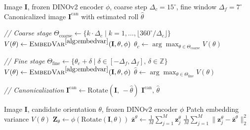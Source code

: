\begin{algorithm}[!htb]
\caption{ROVER: Variance-based Canonical Orientation Estimation}
\label{alg:var_alg}
\begin{algorithmic}[1]
    \REQUIRE Image $\mathbf{I}$, frozen DINOv2 encoder $\phi$, 
             coarse step $\Delta_c = 15^\circ$, fine window 
             $\Delta_f = 7^\circ$
    \ENSURE Canonicalized image $\mathbf{I}^{\mathrm{can}}$ 
            with estimated roll $\hat{\theta}$

    \STATE \textit{// Coarse stage}
    \STATE $\Theta_\text{coarse} \leftarrow 
           \{k \cdot \Delta_c \mid k = 1, \ldots, 
           \lfloor 360^\circ / \Delta_c \rfloor\}$
        \STATE $V(\theta) \leftarrow \textsc{EmbedVar}^{\ref{alg:embedvar}}
               (\mathbf{I}, \theta, \phi)$
    \ENDFOR
    \STATE $\theta_c \leftarrow 
           \arg\max_{\theta \in \Theta_\text{coarse}} V(\theta)$

    \STATE \textit{// Fine stage}
    \STATE $\Theta_\text{fine} \leftarrow 
           \{\theta_c + \delta \mid \delta \in 
           [-\Delta_f, \Delta_f],\, \delta \in \mathbb{Z}\}$
        \STATE $V(\theta) \leftarrow \textsc{EmbedVar}^{\ref{alg:embedvar}}
               (\mathbf{I}, \theta, \phi)$
    \ENDFOR
    \STATE $\hat{\theta} \leftarrow 
           \arg\max_{\theta \in \Theta_\text{fine}} V(\theta)$

    \STATE \textit{// Canonicalization}
    \STATE $\mathbf{I}^{\mathrm{can}} \leftarrow 
           \mathrm{Rotate}(\mathbf{I},\, -\hat{\theta})$
    \RETURN $\mathbf{I}^{\mathrm{can}},\, \hat{\theta}$
\end{algorithmic}
\end{algorithm}

\begin{algorithm}[!htb]
\caption{\textsc{EmbedVar}: Patch Embedding Variance Computation}
\label{alg:embedvar}
\begin{algorithmic}[1]
    \REQUIRE Image $\mathbf{I}$, candidate orientation $\theta$, 
             frozen DINOv2 encoder $\phi$
    \ENSURE Patch embedding variance $V(\theta)$
    \STATE $\mathbf{Z}_\theta \leftarrow 
           \phi(\mathrm{Rotate}(\mathbf{I}, \theta))$
    \STATE $\bar{\mathbf{z}}^\theta \leftarrow 
           \frac{1}{M}\sum_{j=1}^{M} \mathbf{z}_j^\theta$
    \RETURN $\frac{1}{M}\sum_{j=1}^{M}
            \|\mathbf{z}_j^\theta - 
            \bar{\mathbf{z}}^\theta\|_2^2$
\end{algorithmic}
\end{algorithm}


